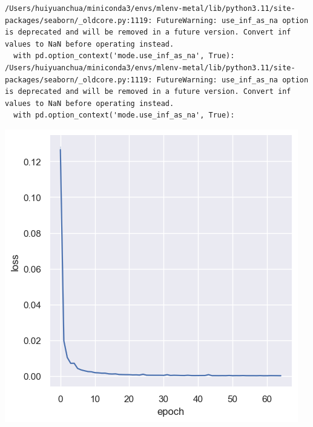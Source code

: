 \documentclass[a4paper, 11pt]{article}
\begin{document}
\begin{verbatim}
/Users/huiyuanchua/miniconda3/envs/mlenv-metal/lib/python3.11/site-packages/seaborn/_oldcore.py:1119: FutureWarning: use_inf_as_na option is deprecated and will be removed in a future version. Convert inf values to NaN before operating instead.
  with pd.option_context('mode.use_inf_as_na', True):
/Users/huiyuanchua/miniconda3/envs/mlenv-metal/lib/python3.11/site-packages/seaborn/_oldcore.py:1119: FutureWarning: use_inf_as_na option is deprecated and will be removed in a future version. Convert inf values to NaN before operating instead.
  with pd.option_context('mode.use_inf_as_na', True):
\end{verbatim}

\begin{center}
\includegraphics[width=.9\linewidth]{./.ob-jupyter/9116398acd8b24680bfcc5c9c8c5b48242340955.png}
\end{center}
\end{document}
